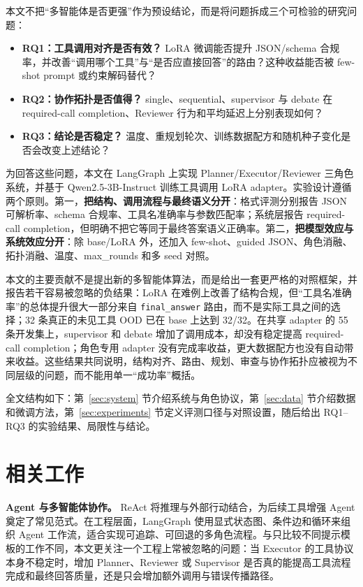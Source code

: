 \documentclass[UTF8,a4paper,12pt]{ctexart}
\begin{document}
本文不把“多智能体是否更强”作为预设结论，而是将问题拆成三个可检验的研究问题：
\begin{itemize}
  \item \textbf{RQ1：工具调用对齐是否有效？} LoRA 微调能否提升 JSON/schema 合规率，并改善“调用哪个工具”与“是否应直接回答”的路由？这种收益能否被 few-shot prompt 或约束解码替代？
  \item \textbf{RQ2：协作拓扑是否值得？} single、sequential、supervisor 与 debate 在 required-call completion、Reviewer 行为和平均延迟上分别表现如何？
  \item \textbf{RQ3：结论是否稳定？} 温度、重规划轮次、训练数据配方和随机种子变化是否会改变上述结论？
\end{itemize}

为回答这些问题，本文在 LangGraph 上实现 Planner/Executor/Reviewer 三角色系统，并基于 Qwen2.5-3B-Instruct 训练工具调用 LoRA adapter。实验设计遵循两个原则。第一，\textbf{把结构、调用流程与最终语义分开}：格式评测分别报告 JSON 可解析率、schema 合规率、工具名准确率与参数匹配率；系统层报告 required-call completion，但明确不把它等同于最终答案语义正确率。第二，\textbf{把模型效应与系统效应分开}：除 base/LoRA 外，还加入 few-shot、guided JSON、角色消融、拓扑消融、温度、max\_rounds 和多 seed 对照。

本文的主要贡献不是提出新的多智能体算法，而是给出一套更严格的对照框架，并报告若干容易被忽略的负结果：LoRA 在难例上改善了结构合规，但“工具名准确率”的总体提升很大一部分来自 \texttt{final\_answer} 路由，而不是实际工具之间的选择；32 条真正的未见工具 OOD 已在 base 上达到 32/32。在共享 adapter 的 55 条开发集上，supervisor 和 debate 增加了调用成本，却没有稳定提高 required-call completion；角色专用 adapter 没有完成率收益，更大数据配方也没有自动带来收益。这些结果共同说明，结构对齐、路由、规划、审查与协作拓扑应被视为不同层级的问题，而不能用单一“成功率”概括。

全文结构如下：第~\ref{sec:system} 节介绍系统与角色协议，第~\ref{sec:data} 节介绍数据和微调方法，第~\ref{sec:experiments} 节定义评测口径与对照设置，随后给出 RQ1--RQ3 的实验结果、局限性与结论。
\clearpage
\section{相关工作}
\textbf{Agent 与多智能体协作。} ReAct 将推理与外部行动结合，为后续工具增强 Agent 奠定了常见范式\cite{yao2023react}。在工程层面，LangGraph 使用显式状态图、条件边和循环来组织 Agent 工作流，适合实现可追踪、可回退的多角色流程\cite{langgraph}。与只比较不同提示模板的工作不同，本文更关注一个工程上常被忽略的问题：当 Executor 的工具协议本身不稳定时，增加 Planner、Reviewer 或 Supervisor 是否真的能提高工具流程完成和最终回答质量，还是只会增加额外调用与错误传播路径。
\end{document}
